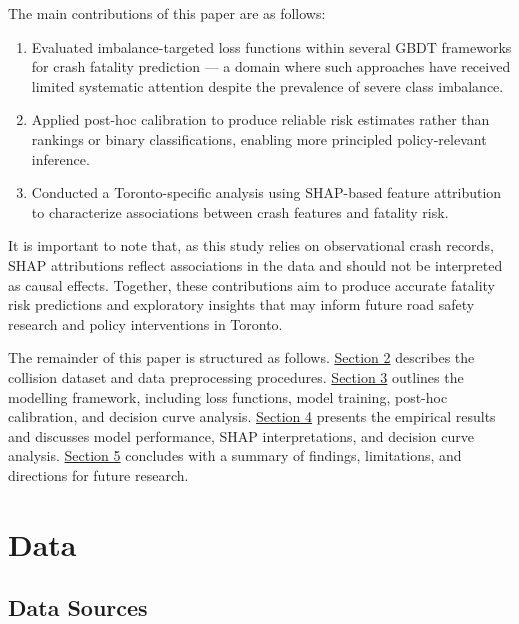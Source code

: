 \documentclass{article}
\begin{document}
\noindent The main contributions of this paper are as follows:
\begin{enumerate}
    \item Evaluated imbalance-targeted loss functions within several GBDT frameworks for crash fatality prediction — a domain where such approaches have received limited systematic attention despite the prevalence of severe class imbalance.
    \item Applied post-hoc calibration to produce reliable risk estimates rather than rankings or binary classifications, enabling more principled policy-relevant inference.
    \item Conducted a Toronto-specific analysis using SHAP-based feature attribution to characterize associations between crash features and fatality risk.
\end{enumerate}
It is important to note that, as this study relies on observational crash records, SHAP attributions reflect associations in the data and should not be interpreted as causal effects. Together, these contributions aim to produce accurate fatality risk predictions and exploratory insights that may inform future road safety research and policy interventions in Toronto.

The remainder of this paper is structured as follows. \hyperref[sec:Data]{Section 2} describes the collision dataset and data preprocessing procedures. \hyperref[sec:Methodology]{Section 3} outlines the modelling framework, including loss functions, model training, post-hoc calibration, and decision curve analysis. \hyperref[sec:Results]{Section 4} presents the empirical results and discusses model performance, SHAP interpretations, and decision curve analysis. \hyperref[sec:Conclusion]{Section 5} concludes with a summary of findings, limitations, and directions for future research.



\section{Data}
\label{sec:Data}
\subsection{Data Sources}
\end{document}
